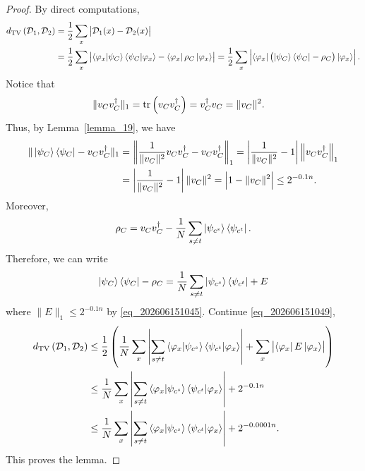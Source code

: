 \begin{proof}
By direct computations,
\begin{align}\label{eq_202606151049}
d_{\mathrm{TV}}\left(\mathcal{D}_1,\mathcal{D}_2\right)&=
\frac{1}{2}\sum_{x}\left|\mathcal{D}_1(x)-\mathcal{D}_2(x)\right|\notag\\
&=\frac{1}{2}\sum_{x}\left|\bra{\varphi_x}\ket{\psi_C}\bra{\psi_C}\ket{\varphi_x}-\bra{\varphi_x}\rho_C\ket{\varphi_x}\right|=\frac{1}{2}\sum_{x}\left|\bra{\varphi_x}\left(\ket{\psi_C}\bra{\psi_C}-\rho_C\right)\ket{\varphi_x}\right|.
\end{align}
Notice that
\begin{align*}
\|v_Cv_C^\dagger\|_1&=\tr\left(v_Cv_C^\dagger\right)=v_C^\dagger v_C=\|v_C\|^2.
\end{align*}
Thus, by Lemma~\ref{lemma_19}, we have
\begin{align}\label{eq_202606151045}
\|\ket{\psi_C}\bra{\psi_C}-v_Cv_C^\dagger\|_1&=\left\|\frac{1}{\|v_C\|^2}v_Cv_C^\dagger-v_Cv_C^\dagger\right\|_1=\left|\frac{1}{\|v_C\|^2}-1\right|\left\|v_Cv_C^\dagger\right\|_1\notag\\
&=\left|\frac{1}{\|v_C\|^2}-1\right|\|v_C\|^2=\left|1-\|v_C\|^2\right|\le2^{-0.1n}.
\end{align}
Moreover,
\begin{align*}
\rho_C=v_Cv_C^\dagger-\frac{1}{N}\sum_{s\neq t}\ket{\psi_{c^s}}\bra{\psi_{c^t}}.
\end{align*}
Therefore, we can write
\begin{align*}
\ket{\psi_C}\bra{\psi_C}-\rho_C=\frac{1}{N}\sum_{s\neq t}\ket{\psi_{c^s}}\bra{\psi_{c^t}}+E
\end{align*}
where $\|E\|_1\le2^{-0.1n}$ by \eqref{eq_202606151045}.
Continue \eqref{eq_202606151049},
\begin{align*}
d_{\mathrm{TV}}\left(\mathcal{D}_1,\mathcal{D}_2\right)&\le
\frac{1}{2}\left(\frac{1}{N}\sum_{x}\left|\sum_{s\neq t}\bra{\varphi_x}\ket{\psi_{c^s}}\bra{\psi_{c^t}}\ket{\varphi_x}\right|+\sum_{x}\left|\bra{\varphi_x}E\ket{\varphi_x}\right|\right)\\
&\le\frac{1}{N}\sum_{x}\left|\sum_{s\neq t}\bra{\varphi_x}\ket{\psi_{c^s}}\bra{\psi_{c^t}}\ket{\varphi_x}\right|+2^{-0.1n}\\
&\le\frac{1}{N}\sum_{x}\left|\sum_{s\neq t}\bra{\varphi_x}\ket{\psi_{c^s}}\bra{\psi_{c^t}}\ket{\varphi_x}\right|+2^{-0.0001n}.\\
\end{align*}
This proves the lemma.
\end{proof}

